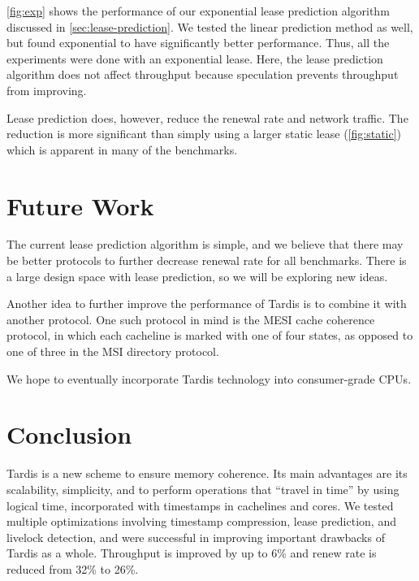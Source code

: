 \documentclass[12pt]{article}
\begin{document}
	\cref{fig:exp} shows the performance of our exponential lease 
	prediction algorithm discussed in \cref{sec:lease-prediction}. We tested the linear prediction method as well, but found exponential to have significantly better performance. Thus, all the experiments were done with an exponential lease.
	Here, the lease prediction algorithm does not affect throughput 
	because speculation prevents throughput from improving.
	
	Lease prediction does, however, reduce the renewal rate and network 
	traffic. The reduction is more significant than simply using a larger 
	static lease (\cref{fig:static}) which is apparent in many of the 
	benchmarks.
	
	\section{Future Work}
	
	The current lease prediction algorithm is simple, and we believe that 
	there may be better protocols to further decrease renewal rate for all 
	benchmarks. There is a large design space with lease prediction, so we 
	will be exploring new ideas.
	
	Another idea to further improve the performance of Tardis is to 
	combine it with another protocol. One such protocol in mind is the 
	MESI cache coherence protocol, in which each cacheline is marked with 
	one of four states, as opposed to one of three in the MSI directory 
	protocol.
	
	We hope to eventually incorporate Tardis technology into consumer-grade CPUs.
	\section{Conclusion}
	
	Tardis is a new scheme to ensure memory coherence. Its main advantages 
	are its scalability, simplicity, and to perform operations that 
	``travel in time'' by using logical time, incorporated with timestamps 
	in cachelines and cores. We tested multiple optimizations involving 
	timestamp compression, lease prediction, and livelock detection, and 
	were successful in improving important drawbacks of Tardis as a whole. Throughput is improved by up to 6\% and renew rate is reduced from 32\% to 26\%.
	
	{
		
		
	}
\end{document}
